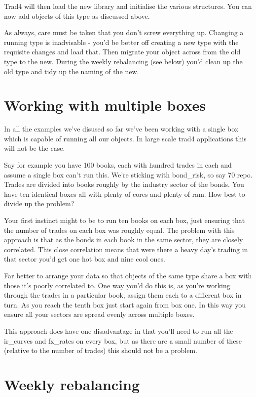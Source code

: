 \documentclass{report}
\begin{document}
Trad4 will then load the new library and initialise the various structures. You can now add objects of this type as discussed above.

As always, care must be taken that you don't screw everything up. Changing a running type is inadvisable - you'd be better off creating a new type with the requisite changes and load that. Then migrate your object across from the old type to the new. During the weekly rebalancing (see below) you'd clean up the old type and tidy up the naming of the new.

\section{Working with multiple boxes}

In all the examples we've disused so far we've been working with a single box which is capable of running  all our objects. In large scale trad4 applications this will not be the case.

Say for example you have 100 books, each with hundred trades in each and assume a single box can't run this. We're sticking with bond_risk, so say 70%
repo. Trades are divided into books roughly by the industry sector of the bonds. You have ten identical boxes all with plenty of cores and plenty of ram. How best to divide up the problem?

Your first instinct might to be to run ten books on each box, just ensuring that the number of trades on each box was roughly equal. The problem with this approach is that as the bonds in each book in the same sector, they are closely correlated. This close correlation means that were there a heavy day's trading in that sector you'd get one hot box and nine cool ones.

Far better to arrange your data so that objects of the same type share a box with those it's poorly correlated to. One way you'd do this is, as you're working through the trades in a particular book, assign them each to a different box in turn. As you reach the tenth box just start again from box one. In this way you ensure all your sectors are spread evenly across multiple boxes.

This approach does have one disadvantage in that you'll need to run all the ir_curves and fx_rates on every box, but as there are a small number of these (relative to the number of trades) this should not be a problem.

\section{Weekly rebalancing}
\end{document}
